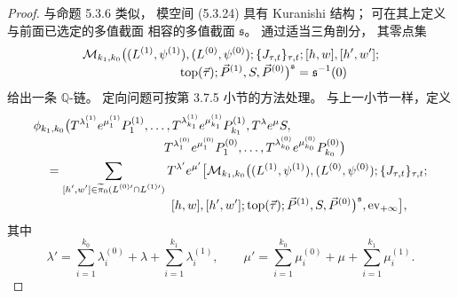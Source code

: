 \begin{proof}
与命题 5.3.6 类似，
模空间 (5.3.24) 具有 Kuranishi 结构；
可在其上定义与前面已选定的多值截面
相容的多值截面 $\mathfrak s$。
通过适当三角剖分，
其零点集
\[
\begin{aligned}
&\mathcal M_{k_1,k_0}
\bigl((L^{(1)},\psi^{(1)}),
      (L^{(0)},\psi^{(0)});
\{J_{\tau,t}\}_{\tau,t};
[h,w],[h',w'];\\[-1mm]
&\hspace{27mm}
\operatorname{top}(\vec\tau);
\vec P^{(1)},S,\vec P^{(0)}\bigr)^{\mathfrak s}
=\mathfrak s^{-1}(0)
\end{aligned}
\]
给出一条 $\mathbb Q$-链。
定向问题可按第 3.7.5 小节的方法处理。
与上一小节一样，定义
\[
\begin{aligned}
&\phi_{k_1,k_0}
\bigl(T^{\lambda_1^{(1)}}e^{\mu_1^{(1)}}P_1^{(1)},
\ldots,
T^{\lambda_{k_1}^{(1)}}e^{\mu_{k_1}^{(1)}}P_{k_1}^{(1)},
T^\lambda e^\mu S,\\[-1mm]
&\hspace{37mm}
T^{\lambda_1^{(0)}}e^{\mu_1^{(0)}}P_1^{(0)},
\ldots,
T^{\lambda_{k_0}^{(0)}}e^{\mu_{k_0}^{(0)}}P_{k_0}^{(0)}
\bigr)\\
&\quad =
\sum_{\substack{[h',w']\in
\widetilde\pi_0(L^{(0)\prime}\cap L^{(1)\prime})}}
T^{\lambda'}e^{\mu'}
\bigl[
\mathcal M_{k_1,k_0}
\bigl((L^{(1)},\psi^{(1)}),
      (L^{(0)},\psi^{(0)});
\{J_{\tau,t}\}_{\tau,t};\\[-1mm]
&\hspace{39mm}
[h,w],[h',w'];
\operatorname{top}(\vec\tau);
\vec P^{(1)},S,\vec P^{(0)}
\bigr)^{\mathfrak s},
\operatorname{ev}_{+\infty}
\bigr],
\end{aligned}
\]
其中
\[
\lambda'
=\sum_{i=1}^{k_0}\lambda_i^{(0)}
 +\lambda
 +\sum_{i=1}^{k_1}\lambda_i^{(1)},
\qquad
\mu'
=\sum_{i=1}^{k_0}\mu_i^{(0)}
 +\mu
 +\sum_{i=1}^{k_1}\mu_i^{(1)}.
\]


\end{proof}
